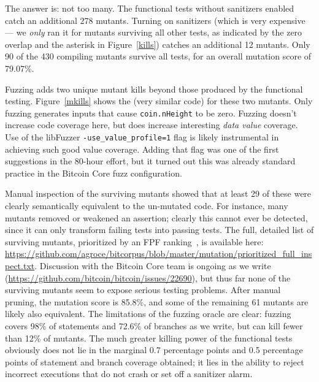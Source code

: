 The answer is: not too many.  The functional tests without sanitizers
enabled catch an additional 278 mutants.  Turning on sanitizers (which
is very expensive --- we \emph{only} ran it for mutants surviving all other
tests, as indicated by the zero overlap and the asterisk in Figure~\ref{kills}) catches an additional 12 mutants.  Only 90 of the
430 compiling mutants survive all tests, for an overall mutation score
of 79.07\%.

Fuzzing adds two unique mutant kills beyond those produced by
the functional testing.  Figure~\ref{mkills} shows the (very similar
code) for these two mutants.  Only fuzzing generates inputs that cause
{\tt coin.nHeight} to be zero.  Fuzzing doesn't increase code coverage
here, but does increase interesting \emph{data value} coverage.  Use
of the libFuzzer {\tt -use\_value\_profile=1} flag is likely
instrumental in achieving such good value coverage.  Adding that flag was
one of the first suggestions in the 80-hour effort, but it turned out
this was already standard practice in the Bitcoin Core fuzz configuration.


Manual inspection of the surviving mutants showed that at
least 29 of these were clearly semantically equivalent to the
un-mutated code.  For instance, many mutants removed or weakened an
assertion; clearly this cannot ever be detected, since it can only
transform failing tests into passing tests.  The full, detailed list
of surviving mutants, prioritized by an FPF ranking~\cite{10.1145/2491956.2462173,Gonzalez85}, is
available here:
\url{https://github.com/agroce/bitcorpus/blob/master/mutation/prioritized_full_inspect.txt}.
Discussion with the Bitcoin Core team is ongoing as we write
(\url{https://github.com/bitcoin/bitcoin/issues/22690}), but thus far
none of the surviving mutants seem to expose serious testing
problems.  After manual pruning, the mutation score is 85.8\%, and
some of the remaining 61 mutants are likely also equivalent.  The
limitations of the fuzzing oracle are clear: fuzzing covers 98\% of
statements and 72.6\% of branches as we write, but can kill fewer than
12\% of mutants.  The much greater killing power of the functional
tests obviously does not lie in the marginal 0.7 percentage points and 0.5
percentage points of statement and branch coverage obtained; it lies
in the ability to reject incorrect executions that do not crash or set
off a sanitizer alarm.


